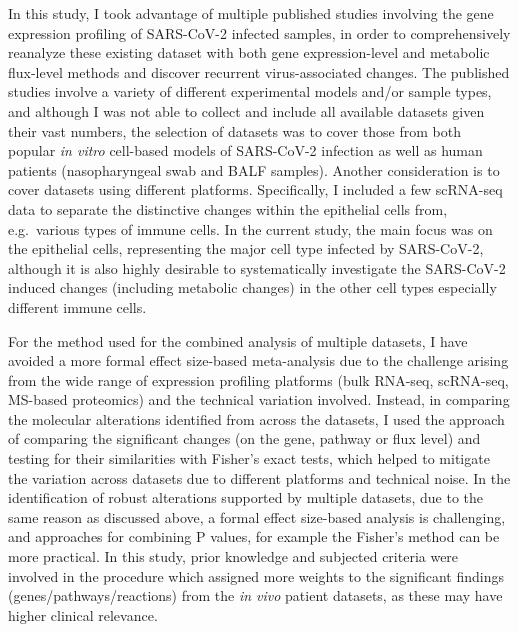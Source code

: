 \documentclass[12pt,twoside,openany,\mydriver]{thesis}  %
\begin{document}
In this study, I took advantage of multiple published studies involving the gene expression profiling of SARS-CoV-2 infected samples, in order to comprehensively reanalyze these existing dataset with both gene expression-level and metabolic flux-level methods and discover recurrent virus-associated changes. The published studies involve a variety of different experimental models and/or sample types, and although I was not able to collect and include all available datasets given their vast numbers, the selection of datasets was to cover those from both popular \emph{in vitro} cell-based models of SARS-CoV-2 infection as well as human patients (nasopharyngeal swab and BALF samples). Another consideration is to cover datasets using different platforms. Specifically, I included a few scRNA-seq data to separate the distinctive changes within the epithelial cells from, e.g.~various types of immune cells. In the current study, the main focus was on the epithelial cells, representing the major cell type infected by SARS-CoV-2, although it is also highly desirable to systematically investigate the SARS-CoV-2 induced changes (including metabolic changes) in the other cell types especially different immune cells.

For the method used for the combined analysis of multiple datasets, I have avoided a more formal effect size-based meta-analysis due to the challenge arising from the wide range of expression profiling platforms (bulk RNA-seq, scRNA-seq, MS-based proteomics) and the technical variation involved. Instead, in comparing the molecular alterations identified from across the datasets, I used the approach of comparing the significant changes (on the gene, pathway or flux level) and testing for their similarities with Fisher's exact tests, which helped to mitigate the variation across datasets due to different platforms and technical noise. In the identification of robust alterations supported by multiple datasets, due to the same reason as discussed above, a formal effect size-based analysis is challenging, and approaches for combining P values, for example the Fisher's method can be more practical. In this study, prior knowledge and subjected criteria were involved in the procedure which assigned more weights to the significant findings (genes/pathways/reactions) from the \emph{in vivo} patient datasets, as these may have higher clinical relevance.
\end{document}
